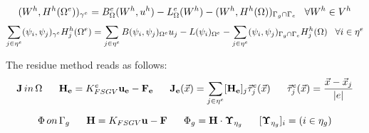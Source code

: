 \begin{equation*}
(W^h,H^h(\Omega^e))_{\gamma^e}=B_\Omega^e(W^h,u^h)-L_\Omega^e(W^h)-(W^h,H^h(\Omega))_{\Gamma_g\cap\Gamma_e} \psp{5} \forall W^h\in V^h
\end{equation*}
\begin{equation*}
\sum_{j\in \eta^e} (\psi_i,\psi_j)_{\gamma^e}H^h_j(\Omega^e)=\sum_{j\in \eta^e}B(\psi_i,\psi_j)_{\Omega^e}u_j-L(\psi_i)_{\Omega^e}-\sum_{j\in \eta^e}(\psi_i,\psi_j)_{\Gamma_g\cap\Gamma_e}H_j^h(\Omega) \psp{5} \forall i \in \eta^e
\end{equation*}

The residue method reads as follows:
$$\vect{J} \, in  \, \Omega \psp{10}
\vect{H_e} = K_{FSGV}^e \vect{u_e} - \vect{F_e} 
\psp{10}
\vect{J_e}(\vec{x}) = \sum_{j\in \eta^e}[\vect{H_e}]_j\vec{\tau}_j^e(\vec{x})
\psp{10}
\vec{\tau}_j^e(\vec{x})=\dfrac{\vec{x}-\vec{x}_j}{|e|}$$

$$\Phi \, on  \, \Gamma_g 
\psp{10}
\vect{H} = K_{FSGV} \vect{u} - \vect{F} 
\psp{10}
\Phi_g = \vect{H} \cdot \vect{\Upsilon}_{\eta_g}
\psp{10}
[\vect{\Upsilon}_{\eta_g}]_i=(i\in \eta_g) $$